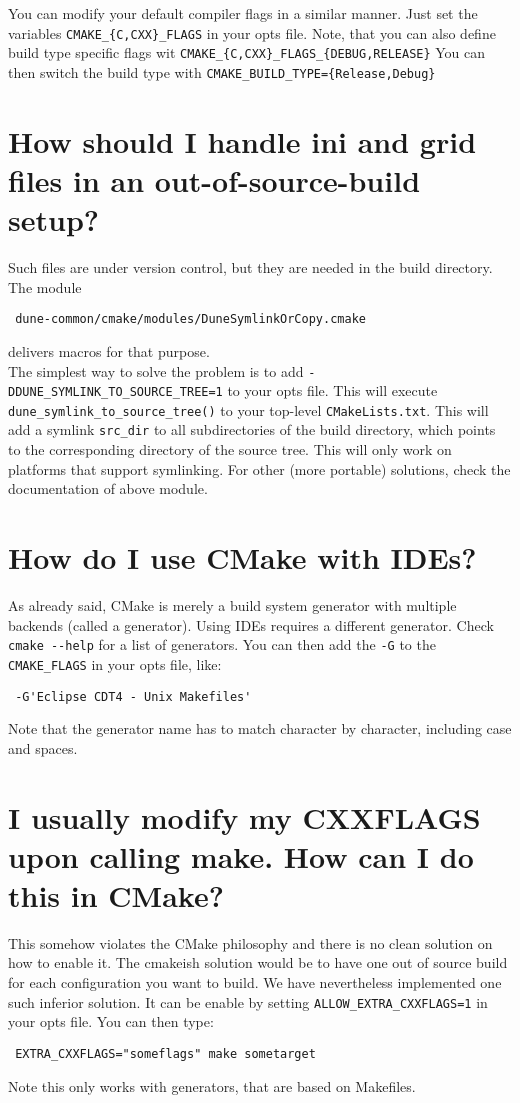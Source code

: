 \documentclass[a4paper,10pt]{scrartcl}
\begin{document}
You can modify your default compiler flags in a similar manner. Just set the variables \lstinline!CMAKE_{C,CXX}_FLAGS! in your opts file. Note, that you can also define build type specific flags wit \lstinline!CMAKE_{C,CXX}_FLAGS_{DEBUG,RELEASE}! You can then switch the build type with \lstinline!CMAKE_BUILD_TYPE={Release,Debug}!

\section{How should I handle ini and grid files in an out-of-source-build setup?}
\label{inifiles}
Such files are under version control, but they are needed in the build directory. The module
\begin{lstlisting}
 dune-common/cmake/modules/DuneSymlinkOrCopy.cmake
\end{lstlisting}
delivers macros for that purpose. \\

The simplest way to solve the problem is to add  \verb!-DDUNE_SYMLINK_TO_SOURCE_TREE=1! to your opts file. This will execute \lstinline!dune_symlink_to_source_tree()! to your top-level \lstinline!CMakeLists.txt!. This will add a symlink \lstinline!src_dir! to all subdirectories of the build directory, which points to the corresponding directory of the source tree. This will only work on platforms that support symlinking. For other (more portable) solutions, check the documentation of above module.

\section{How do I use CMake with IDEs?}
\label{ides}
As already said, CMake is merely a build system generator with multiple backends (called a generator). Using IDEs requires a different generator. Check \lstinline!cmake --help! for a list of generators. You can then add the \lstinline!-G! to the \verb!CMAKE_FLAGS! in your opts file, like:
\begin{lstlisting}
 -G'Eclipse CDT4 - Unix Makefiles'
\end{lstlisting}
Note that the generator name has to match character by character, including case and spaces.

\section{I usually modify my CXXFLAGS upon calling make. How can I do this in CMake?}
\label{cxxflags}
This somehow violates the CMake philosophy and there is no clean solution on how to enable it. The cmakeish solution would be to have one out of source build for each configuration you want to build. We have nevertheless implemented one such inferior solution. It can be enable by setting \lstinline!ALLOW_EXTRA_CXXFLAGS=1! in your opts file. You can then type:
\begin{lstlisting}
 EXTRA_CXXFLAGS="someflags" make sometarget
\end{lstlisting}
Note this only works with generators, that are based on Makefiles.
\end{document}
